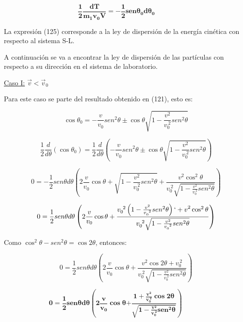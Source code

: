 \documentclass[]{article}
\begin{document}
\[\frac{\mathbf{1}}{\mathbf{2}}\frac{\mathbf{dT}}{\mathbf{m}_{\mathbf{1}}\mathbf{v}_{\mathbf{0}}\mathbf{V}}\mathbf{= -}\frac{\mathbf{1}}{\mathbf{2}}\mathbf{sen}\mathbf{\theta}_{\mathbf{0}}\mathbf{d}\mathbf{\theta}_{\mathbf{0}}\mathbf{\ \ \ \ \ \ \ \ \ \ \ \ \ }\]

La expresión (125) corresponde a la ley de dispersión de la energía
cinética con respecto al sistema S-L.

A continuación se va a encontrar la ley de dispersión de las partículas
con respecto a su dirección en el sistema de laboratorio.

\uline{Caso I:} \(\overrightarrow{v} < {\overrightarrow{v}}_{0}\)

Para este caso se parte del resultado obtenido en (121), esto es:

\[\cos\theta_{0} = - \frac{v}{v_{0}}{sen}^{2}\theta \pm \cos\theta\sqrt{1 - \frac{v^{2}}{v_{0}^{\ 2}}{sen}^{2}\theta}\]

\[\frac{1}{2}\frac{d}{d\theta}\left( \cos\theta_{0} \right) = \frac{1}{2}\frac{d}{d\theta}\left( - \frac{v}{v_{0}}{sen}^{2}\theta \pm \cos\theta\sqrt{1 - \frac{v^{2}}{v_{0}^{\ 2}}{sen}^{2}\theta} \right)\]

\[0 = - \frac{1}{2}{sen}\theta d\theta\left( 2\frac{v}{v_{0}}\cos\theta + \sqrt{1 - \frac{v^{2}}{v_{0}^{\ 2}}{sen}^{2}\theta} + \frac{v^{2}\cos^{2}\theta}{v_{0}^{\ 2}\sqrt{1 - \frac{v^{2}}{v_{0}^{\ 2}}{sen}^{2}\theta}} \right)\]

\[0 = \frac{1}{2}{sen}\theta d\theta\left( 2\frac{v}{v_{0}}\cos\theta + \frac{v_{0}^{\ 2}\left( 1 - \frac{v^{2}}{v_{0}^{\ 2}}{sen}^{2}\theta \right){` + v}^{2}\cos^{2}\theta}{v_{0}^{\ 2}\sqrt{1 - \frac{v^{2}}{v_{0}^{\ 2}}{sen}^{2}\theta}} \right)\]

Como \(\cos^{2}\theta - {sen}^{2}\theta = \cos{2\theta}\), entonces:

\[0 = \frac{1}{2}{sen}\theta d\theta\left( 2\frac{v}{v_{0}}\cos\theta + \frac{v^{2}\cos{2\theta} + v_{0}^{\ 2}}{v_{0}^{\ 2}\sqrt{1 - \frac{v^{2}}{v_{0}^{\ 2}}{sen}^{2}\theta}} \right)\]

\[\mathbf{0 =}\frac{\mathbf{1}}{\mathbf{2}}\mathbf{sen}\mathbf{\theta}\mathbf{d\theta}\left( \mathbf{2}\frac{\mathbf{v}}{\mathbf{v}_{\mathbf{0}}}\mathbf{\cos}\mathbf{\theta}\mathbf{+}\frac{\mathbf{1 +}\frac{\mathbf{v}^{\mathbf{2}}}{\mathbf{v}_{\mathbf{0}}^{\mathbf{\ 2}}}\mathbf{\cos}{\mathbf{2}\mathbf{\theta}}}{\sqrt{\mathbf{1 -}\frac{\mathbf{v}^{\mathbf{2}}}{\mathbf{v}_{\mathbf{0}}^{\mathbf{\ 2}}}\mathbf{sen}^{\mathbf{2}}\mathbf{\theta}}} \right)\mathbf{\ \ \ \ \ \ \ \ \ \ \ \ \ \ }\]
\end{document}
